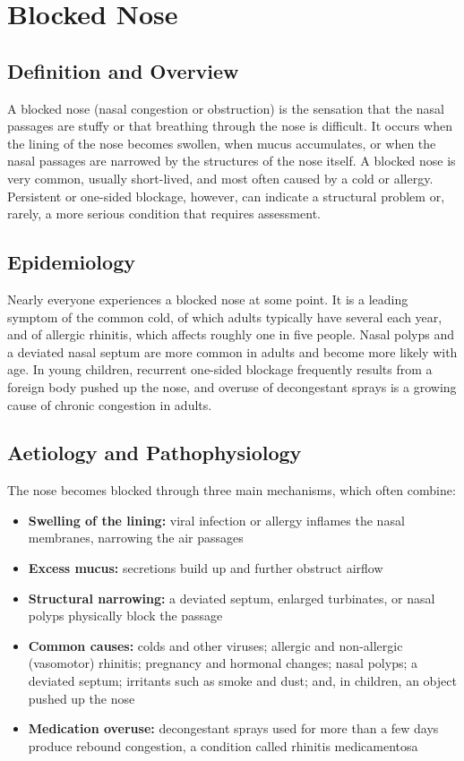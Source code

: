 \chapter{Blocked Nose}

\section*{Definition and Overview}
A blocked nose (nasal congestion or obstruction) is the sensation that the nasal passages are stuffy or that breathing through the nose is difficult. It occurs when the lining of the nose becomes swollen, when mucus accumulates, or when the nasal passages are narrowed by the structures of the nose itself. A blocked nose is very common, usually short-lived, and most often caused by a cold or allergy. Persistent or one-sided blockage, however, can indicate a structural problem or, rarely, a more serious condition that requires assessment.

\section*{Epidemiology}
Nearly everyone experiences a blocked nose at some point. It is a leading symptom of the common cold, of which adults typically have several each year, and of allergic rhinitis, which affects roughly one in five people. Nasal polyps and a deviated nasal septum are more common in adults and become more likely with age. In young children, recurrent one-sided blockage frequently results from a foreign body pushed up the nose, and overuse of decongestant sprays is a growing cause of chronic congestion in adults.

\section*{Aetiology and Pathophysiology}
The nose becomes blocked through three main mechanisms, which often combine:

\begin{itemize}
    \item \textbf{Swelling of the lining:} viral infection or allergy inflames the nasal membranes, narrowing the air passages
    \item \textbf{Excess mucus:} secretions build up and further obstruct airflow
    \item \textbf{Structural narrowing:} a deviated septum, enlarged turbinates, or nasal polyps physically block the passage
    \item \textbf{Common causes:} colds and other viruses; allergic and non-allergic (vasomotor) rhinitis; pregnancy and hormonal changes; nasal polyps; a deviated septum; irritants such as smoke and dust; and, in children, an object pushed up the nose
    \item \textbf{Medication overuse:} decongestant sprays used for more than a few days produce rebound congestion, a condition called rhinitis medicamentosa
\end{itemize}

